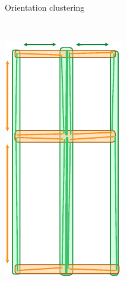 \begin{figure}
\begin{subfigure}[b]{0.48\linewidth}
		\caption{Orientation clustering}%
		\label{fig:lineclust:2}
	\end{subfigure}
\\
	\begin{subfigure}[b]{0.48\linewidth}
		\includegraphics[angle=90,width=\linewidth]{figs/line-clustering/slice3.pdf}

\end{subfigure}
\end{figure}
